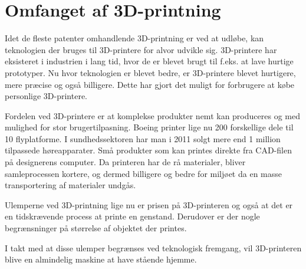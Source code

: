 \chapter{Omfanget af 3D-printning} %
\label{cha:omfanget_af_3d_printer}

Idet de fleste patenter omhandlende 3D-printning er ved at udløbe, kan teknologien der bruges til 3D-printere for alvor udvikle sig. 3D-printere har eksisteret i industrien i lang tid, hvor de er blevet brugt til f.eks. at lave hurtige prototyper. Nu hvor teknologien er blevet bedre, er 3D-printere blevet hurtigere, mere præcise og også billigere. Dette har gjort det muligt for forbrugere at købe personlige 3D-printere. 


Fordelen ved 3D-printere er at komplekse produkter nemt kan produceres og med mulighed for stor brugertilpasning. Boeing printer lige nu 200 forskellige dele til 10 flyplatforme. I sundhedssektoren har man i 2011 solgt mere end 1 million tilpassede høreapparater. \cite{manyika_disruptive_2013} Små produkter som kan printes direkte fra CAD-filen på designerens computer. Da printeren har de rå materialer, bliver samleprocessen kortere, og dermed billigere og bedre for miljøet da en masse transportering af materialer undgås.


Ulemperne ved 3D-printning lige nu er prisen på 3D-printeren og også at det er en tidskrævende process at printe en genstand. Derudover er der nogle begrænsninger på størrelse af objektet der printes.


I takt med at disse ulemper begrænses ved teknologisk fremgang, vil 3D-printeren blive en almindelig maskine at have stående hjemme.

